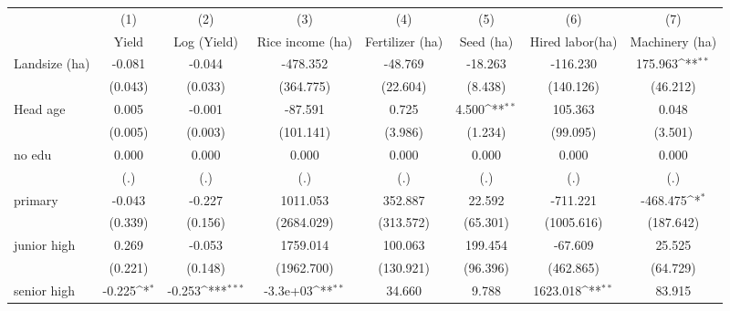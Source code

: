{
\def\sym#1{\ifmmode^{#1}\else\(^{#1}\)\fi}
\begin{tabular}{l*{7}{c}}
\hline\hline
                    &\multicolumn{1}{c}{(1)}         &\multicolumn{1}{c}{(2)}         &\multicolumn{1}{c}{(3)}         &\multicolumn{1}{c}{(4)}         &\multicolumn{1}{c}{(5)}         &\multicolumn{1}{c}{(6)}         &\multicolumn{1}{c}{(7)}         \\
                    &Yield         &Log (Yield)         &Rice income (ha)         &Fertilizer (ha)         &Seed (ha)         &Hired labor(ha)         &Machinery (ha)         \\
\hline
Landsize (ha)       &-0.081         &-0.044         &-478.352         &-48.769         &-18.263         &-116.230         &175.963\sym{**} \\
                    &(0.043)         &(0.033)         &(364.775)         &(22.604)         &(8.438)         &(140.126)         &(46.212)         \\
Head age            &0.005         &-0.001         &-87.591         &0.725         &4.500\sym{**} &105.363         &0.048         \\
                    &(0.005)         &(0.003)         &(101.141)         &(3.986)         &(1.234)         &(99.095)         &(3.501)         \\
no edu              &0.000         &0.000         &0.000         &0.000         &0.000         &0.000         &0.000         \\
                    &  (.)         &  (.)         &  (.)         &  (.)         &  (.)         &  (.)         &  (.)         \\
primary             &-0.043         &-0.227         &1011.053         &352.887         &22.592         &-711.221         &-468.475\sym{*}  \\
                    &(0.339)         &(0.156)         &(2684.029)         &(313.572)         &(65.301)         &(1005.616)         &(187.642)         \\
junior high         &0.269         &-0.053         &1759.014         &100.063         &199.454         &-67.609         &25.525         \\
                    &(0.221)         &(0.148)         &(1962.700)         &(130.921)         &(96.396)         &(462.865)         &(64.729)         \\
senior high         &-0.225\sym{*}  &-0.253\sym{***}&-3.3e+03\sym{**} &34.660         &9.788         &1623.018\sym{**} &83.915         \\

\end{tabular}}
